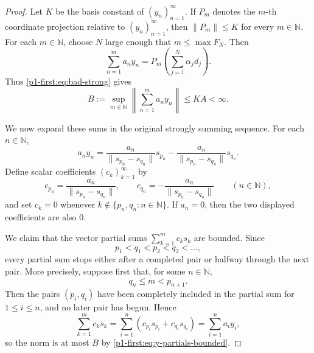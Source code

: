 \documentclass[11pt,reqno]{amsart}
\makeatletter
\theoremstyle{plain}
\theoremstyle{definition}
\newcommand{\N}{\mathbb N}
\newcounter{problempaper}
\newenvironment{problempaperbody}{%
  \setcounter{subsection}{0}%
  \setcounter{subsubsection}{0}%
  \setcounter{paragraph}{0}%
  \renewcommand{\thesubsection}{\arabic{subsection}}%
  \renewcommand{\thesubsubsection}{\thesubsection.\arabic{subsubsection}}%
  \renewcommand{\theparagraph}{\thesubsubsection.\arabic{paragraph}}%
  \let\problem@outersection\section
  \let\problem@outersubsection\subsection
  \let\problem@outersubsubsection\subsubsection
  \let\problem@outerparagraph\paragraph
  \let\section\problem@papersection
  \let\subsection\problem@papersubsection
  \let\subsubsection\problem@papersubsubsection
}{%
  \let\section\problem@outersection
  \let\subsection\problem@outersubsection
  \let\subsubsection\problem@outersubsubsection
  \let\paragraph\problem@outerparagraph
}
\newcommand{\problem@target}[2]{%
  \hypertarget{problem-\theproblempaper-#1-#2}{}%
}
\newcommand{\problem@paperheading}[3]{%
  \par\bigskip
  \problem@target{#1}{#2}%
  \noindent{\large\bfseries #2.\quad #3\par}%
  \nobreak\smallskip
}
\newcommand{\problem@papersubheading}[3]{%
  \par\medskip
  \problem@target{#1}{#2}%
  \noindent{\normalsize\bfseries #2.\quad #3\par}%
  \nobreak\smallskip
}
\newcommand{\problem@papersubsubheading}[3]{%
  \par\smallskip
  \problem@target{#1}{#2}%
  \noindent{\normalsize\itshape #2.\quad #3.\ }%
}
\def\problem@papersection{%
  \@ifstar{\problem@papersectionstar}{\problem@papersectionnostar}%
}
\def\problem@papersectionstar#1{%
  \par\bigskip\noindent{\large\bfseries #1\par}\nobreak\smallskip
}
\def\problem@papersectionnostar#1{%
  \refstepcounter{subsection}%
  \setcounter{subsubsection}{0}%
  \setcounter{paragraph}{0}%
  \problem@paperheading{section}{\thesubsection}{#1}%
  \problem@writecontentsline{section}{\thesubsection}{#1}%
}
\def\problem@papersubsection{%
  \@ifstar{\problem@papersubsectionstar}{\problem@papersubsectionnostar}%
}
\def\problem@papersubsectionstar#1{%
  \par\medskip\noindent{\normalsize\bfseries #1\par}\nobreak\smallskip
}
\def\problem@papersubsectionnostar#1{%
  \refstepcounter{subsubsection}%
  \setcounter{paragraph}{0}%
  \problem@papersubheading{subsection}{\thesubsubsection}{#1}%
  \problem@writecontentsline{subsection}{\thesubsubsection}{#1}%
}
\def\problem@papersubsubsection{%
  \@ifstar{\problem@papersubsubsectionstar}{\problem@papersubsubsectionnostar}%
}
\def\problem@papersubsubsectionstar#1{%
  \par\smallskip\noindent{\normalsize\itshape #1.\ }%
}
\def\problem@papersubsubsectionnostar#1{%
  \refstepcounter{paragraph}%
  \problem@papersubsubheading{subsubsection}{\theparagraph}{#1}%
  \problem@writecontentsline{subsubsection}{\theparagraph}{#1}%
}
\newcommand{\problem@writecontentsline}[3]{%
  \begingroup
  \protected@write\@auxout{}{%
    \string\problemcontentsentry{\theproblempaper}{#1}{#2}{#3}{\thepage}%
  }%
  \endgroup
}
\newcommand{\problemcontentsentry}[5]{%
  \@ifundefined{problemcontents@#1}{%
    \expandafter\gdef\csname problemcontents@#1\endcsname{}%
  }{}%
  \expandafter\g@addto@macro\csname problemcontents@#1\endcsname{%
    \problemcontentsline{#1}{#2}{#3}{#4}{#5}%
  }%
}
\newcommand{\problemcontentslink}[4]{%
  \hyperlink{problem-#1-#2-#3}{#4}%
}
\newcommand{\problemcontentsline}[5]{%
  \ifstrequal{#2}{section}{%
    \par\noindent
    \problemcontentslink{#1}{#2}{#3}{\makebox[2.5em][l]{#3}#4}%
    \nobreak\dotfill
    \problemcontentslink{#1}{#2}{#3}{#5}\par
  }{%
    \ifstrequal{#2}{subsection}{%
      \par\noindent\hspace*{1.5em}%
      \problemcontentslink{#1}{#2}{#3}{\makebox[3.5em][l]{#3}#4}%
      \nobreak\dotfill
      \problemcontentslink{#1}{#2}{#3}{#5}\par
    }{%
      \par\noindent\hspace*{3em}%
      \problemcontentslink{#1}{#2}{#3}{\makebox[4.5em][l]{#3}#4}%
      \nobreak\dotfill
      \problemcontentslink{#1}{#2}{#3}{#5}\par
    }%
  }%
}
\makeatother
\begin{document}
\begin{problempaperbody}
\begin{proof}
Let $K$ be the basis constant of $(y_n)_{n=1}^{\infty}$. If $P_m$ denotes the $m$-th coordinate projection relative to $(y_n)_{n=1}^{\infty}$, then $\|P_m\|\leq K$ for every $m\in\N$. For each $m\in\N$, choose $N$ large enough that $m\leq \max F_N$. Then
\begin{equation*}
        \sum_{n=1}^{m}a_ny_n=P_m\left(\sum_{j=1}^{N}\alpha_jd_j\right).
\end{equation*}
Thus \eqref{p1-first:eq:bad-strong} gives
\begin{equation}
\label{p1-first:eq:y-partials-bounded}
        B:=\sup_{m\in\N}\left\|\sum_{n=1}^{m}a_ny_n\right\|\leq KA<\infty.
\end{equation}

We now expand these sums in the original strongly summing sequence. For each $n\in\N$,
\begin{equation*}
        a_ny_n=\frac{a_n}{\|s_{p_n}-s_{q_n}\|}s_{p_n}-\frac{a_n}{\|s_{p_n}-s_{q_n}\|}s_{q_n}.
\end{equation*}
Define scalar coefficients $(c_k)_{k=1}^{\infty}$ by
\begin{equation*}
        c_{p_n}=\frac{a_n}{\|s_{p_n}-s_{q_n}\|}, \qquad c_{q_n}=-\frac{a_n}{\|s_{p_n}-s_{q_n}\|} \qquad(n\in\N),
\end{equation*}
and set $c_k=0$ whenever $k\notin\{p_n,q_n:n\in\N\}$. If $a_n=0$, then the two displayed coefficients are also $0$.

We claim that the vector partial sums $\sum_{k=1}^{m}c_ks_k$ are bounded. Since
\begin{equation*}
        p_1<q_1<p_2<q_2<\ldots,
\end{equation*}
every partial sum stops either after a completed pair or halfway through the next pair. More precisely, suppose first that, for some $n\in\N$,
\begin{equation*}
        q_n\leq m<p_{n+1}.
\end{equation*}
Then the pairs $(p_i,q_i)$ have been completely included in the partial sum for $1\leq i\leq n$, and no later pair has begun. Hence
\begin{equation*}
        \sum_{k=1}^{m}c_ks_k=\sum_{i=1}^{n}\left(c_{p_i}s_{p_i}+c_{q_i}s_{q_i}\right)=\sum_{i=1}^{n}a_iy_i,
\end{equation*}
so the norm is at most $B$ by \eqref{p1-first:eq:y-partials-bounded}.


\end{proof}
\end{problempaperbody}
\end{document}
